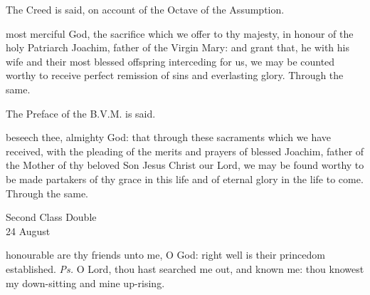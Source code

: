 \begin{rubric}
    The Creed is said, on account of the Octave of the Assumption.
\end{rubric}
\secret
{} most merciful God, the sacrifice which we offer to thy majesty, in honour of the holy Patriarch Joachim, father of the Virgin Mary: and grant that, he with his wife and their most blessed offspring interceding for us, we may be counted worthy to receive perfect remission of sins and everlasting glory. Through the same.
\begin{rubric}
    The Preface of the B.V.M. is said.
\end{rubric}
\postcommunion
{} beseech thee, almighty God: that through these sacraments which we have received, with the pleading of the merits and prayers of blessed Joachim, father of the Mother of thy beloved Son Jesus Christ our Lord, we may be found worthy to be made partakers of thy grace in this life and of eternal glory in the life to come. Through the same.

\begin{inhead}
    {Second Class Double\\
24 August}
\end{inhead}
\par\noindent
{}



\introit
{} honourable are thy friends unto me, O God: right well is their princedom established. \textit{Ps.} O Lord, thou hast searched me out, and known me: thou knowest my down-sitting and mine up-rising.

